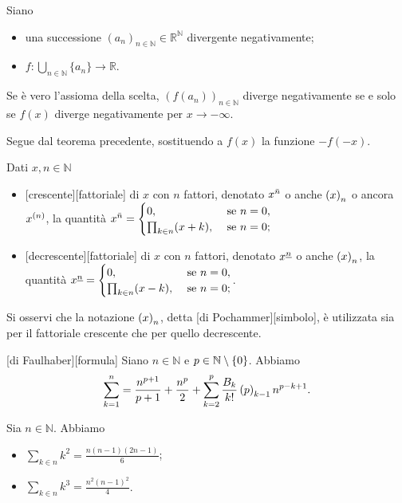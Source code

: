 \begin{Corollary}
	Siano
	\begin{itemize}
		\item una successione $(a_n)_{n \in \mathbb{N}} \in \mathbb{R}^\mathbb{N}$ divergente negativamente;
		\item $f: \bigcup_{n \in \mathbb{N}} \lbrace a_n \rbrace \rightarrow \mathbb{R}$.
	\end{itemize}
	Se \`e vero l'assioma della scelta, $(f(a_n))_{n \in \mathbb{N}}$ diverge negativamente se e solo se $f(x)$ diverge negativamente per $x \rightarrow -\infty$.
\end{Corollary}
\Proof Segue dal teorema precedente, sostituendo a $f(x)$ la funzione $-f(-x)$. \EndProof
\begin{Definition}
  Dati $x, n \in \mathbb{N}$
  \begin{itemize}
    \item {}[crescente][fattoriale]
      di $x$ con $n$ fattori, denotato
      ${x}^{\bar{n}}$ o anche
      $\left ( {x} \right )_{n}$ o ancora
      ${x}^{\left ( n \right )}$,
      la quantit\`a
      ${x}^{\bar{n}} =
      \begin{cases}
        0,&\text{ se }n = 0,\\
        \prod_{k \in n} (x + k),&\text{ se }n = 0;
      \end{cases}$
    \item {}[decrescente][fattoriale]
      di $x$ con $n$ fattori, denotato
      ${x}^{\underline{n}}$ o anche
      $\left ( {x} \right )_{n}$,
      la quantit\`a
      ${x}^{\underline{n}} =
      \begin{cases}
        0,&\text{ se }n = 0,\\
        \prod_{k \in n} (x - k),&\text{ se }n = 0;
      \end{cases}$.
  \end{itemize}
  Si osservi che la notazione $\left ( {x} \right )_{n}$, detta
  [di Pochammer][simbolo],
  \`e utilizzata sia per il fattoriale crescente che per quello
  decrescente.
\end{Definition}
\begin{Theorem}
  [di Faulhaber][formula]
  Siano $n \in \mathbb{N}$ e $p \in \mathbb{N} \setminus \lbrace 0 \rbrace$. Abbiamo
  \[
    \sum_{k = 1}^n =
    \frac{n^{p + 1}}{p + 1} + \frac{n^p}{2}
    + \sum_{k = 2}^p \frac{B_k}{k!} \left ( {p} \right )_{k - 1}
      n^{p - k + 1}.
  \]
\end{Theorem}
\begin{Theorem}
  Sia $n \in \mathbb{N}$. Abbiamo
  \begin{itemize}
    \item $\sum_{k \in n} k^2 = \frac{n(n - 1)(2n - 1)}{6}$;
    \item $\sum_{k \in n} k^3 = \frac{n^2(n - 1)^2}{4}$.
  \end{itemize}
\end{Theorem}
